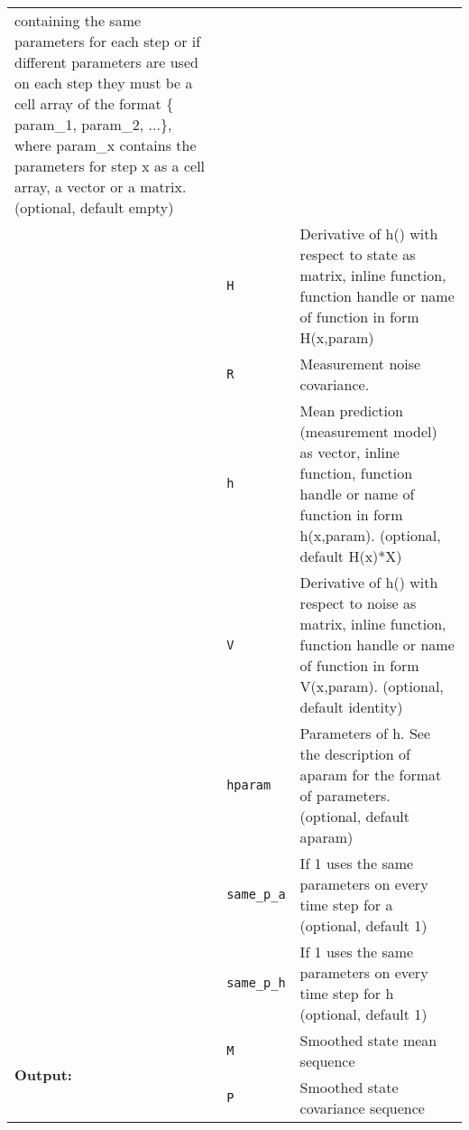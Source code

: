 \begin{tabular*}{\textwidth}{@{\extracolsep{\fill}} | p{} p{} p{} |  }
            containing the same parameters for each step or if different parameters
            are used on each step they must be a cell array of the format
            \{ param\_1, param\_2, ...\}, where param\_x contains the parameters for
            step x as a cell array, a vector or a matrix.   (optional, default empty) \\
 & \texttt{H} & Derivative of h() with respect to state as matrix,
         inline function, function handle or name
         of function in form H(x,param) \\
 & \texttt{R} & Measurement noise covariance. \\
 & \texttt{h} & Mean prediction (measurement model) as vector,
         inline function, function handle or name
         of function in form h(x,param).  (optional, default H(x)*X) \\
 & \texttt{V} & Derivative of h() with respect to noise as matrix,
         inline function, function handle or name
         of function in form V(x,param).  (optional, default identity) \\
 & \texttt{hparam} & Parameters of h. See the description of aparam for the format of
              parameters.                  (optional, default aparam) \\
 & \texttt{same\_p\_a} & If 1 uses the same parameters 
               on every time step for a    (optional, default 1)  \\
 & \texttt{same\_p\_h} & If 1 uses the same parameters 
               on every time step for h    (optional, default 1)  \\
\hline
\multirow{2}{*}{\bf Output:}
 & \texttt{M} & Smoothed state mean sequence \\
 & \texttt{P} & Smoothed state covariance sequence
     \\
\hline
\end{tabular*}
